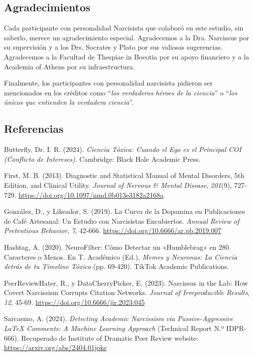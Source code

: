 \documentclass[
  10pt]{article}
\newlength{\cslhangindent}
\newenvironment{CSLReferences}[2] %
 {\begin{list}{}{%
  \setlength{\itemindent}{0pt}
  \setlength{\leftmargin}{0pt}
  \setlength{\parsep}{0pt}
  \ifodd #1
   \setlength{\leftmargin}{\cslhangindent}
   \setlength{\itemindent}{-1\cslhangindent}
  \fi
  \setlength{\itemsep}{#2\baselineskip}}}
 {\end{list}}
\begin{document}
\subsection{Agradecimientos}\label{agradecimientos}

Cada participante con personalidad Narcisista que colaboró en este
estudio, sin saberlo, merece un agradecimiento especial. Agradecemos a
la Dra. Narcissus por su supervisión y a los Drs. Socrates y Plato por
sus valiosas sugerencias. Agradecemos a la Facultad de Thespiae in
Boeotia por su apoyo financiero y a la Academia of Athens por su
infraestructura.

Finalmente, los participantes con personalidad narcisista pidieron ser
mencionados en los créditos como ``\emph{los verdaderos héroes de la
ciencia}'' o ``\emph{los únicos que entienden la verdadera ciencia}''.

\subsection*{Referencias}\label{referencias}

\label{refs}
\begin{CSLReferences}{1}{0}
Butterfly, Dr. I. R. (2024). \emph{Ciencia Tóxica: Cuando el Ego es el
Principal {COI} (Conflicto de Intereses)}. Cambridge: Black Hole
Academic Press.

First, M. B. (2013). Diagnostic and Statistical Manual of Mental
Disorders, 5th Edition, and Clinical Utility. \emph{Journal of Nervous
\& Mental Disease}, \emph{201}(9), 727-729.
\url{https://doi.org/10.1097/nmd.0b013e3182a2168a}

González, D., y Likeador, S. (2019). La Curva de la Dopamina en
Publicaciones de Café Artesanal: Un Estudio con Narcisistas Encubiertos.
\emph{Annual Review of Pretentious Behavior}, \emph{7}, 42-666.
\url{https://doi.org/10.6666/ar.pb.2019.007}

Hashtag, A. (2020). NeuroFilter: Cómo Detectar un {{«Humblebrag»}} en
280 Caracteres o Menos. En T. Académico (Ed.), \emph{Memes y Neuronas:
La Ciencia detrás de tu Timeline Tóxico} (pp. 69-420). TikTok Academic
Publications.

PeerReviewHater, R., y DataCherryPicker, E. (2023). Narcissus in the
Lab: How Covert Narcissism Corrupts Citation Networks. \emph{Journal of
Irreproducible Results}, \emph{12}, 45-69.
\url{https://doi.org/10.6666/jir.2023.045}

Sarcasmo, A. (2024). \emph{Detecting Academic Narcissism via
Passive-Aggressive LaTeX Comments: A Machine Learning Approach}
(Technical Report N.º IDPR-666). Recuperado de Institute of Dramatic
Peer Review website: \url{https://arxiv.org/abs/2404.01joke}

\end{CSLReferences}
\end{document}
